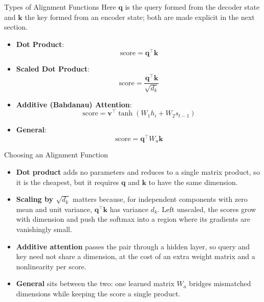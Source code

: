 \begin{frame}{Types of Alignment Functions}
  Here $\mathbf{q}$ is the query formed from the decoder state and $\mathbf{k}$ the key formed from an encoder state; both are made explicit in the next section.
  \begin{itemize}
    \item[\textcolor{red}{$\blacktriangleright$}] \textbf{Dot Product}:
      \begin{equation*}
        \text{score} = \mathbf{q}^\top \mathbf{k}
      \end{equation*}
    \item[\textcolor{red}{$\blacktriangleright$}] \textbf{Scaled Dot Product}:
      \begin{equation*}
        \text{score} = \frac{\mathbf{q}^\top \mathbf{k}}{\sqrt{d_k}}
      \end{equation*}
    \item[\textcolor{red}{$\blacktriangleright$}] \textbf{Additive (Bahdanau) Attention}:
      \begin{equation*}
        \text{score} = \mathbf{v}^\top \tanh(W_1 h_i + W_2 s_{t-1})
      \end{equation*}
    \item[\textcolor{red}{$\blacktriangleright$}] \textbf{General}:
      \begin{equation*}
        \text{score} = \mathbf{q}^\top W_a \mathbf{k}
      \end{equation*}
  \end{itemize}
\end{frame}

\begin{frame}{Choosing an Alignment Function}
  \begin{itemize}
    \item[\textcolor{red}{$\blacktriangleright$}] \textbf{Dot product} adds no parameters and reduces to a single matrix product, so it is the cheapest, but it requires $\mathbf{q}$ and $\mathbf{k}$ to have the same dimension.
    \item[\textcolor{red}{$\blacktriangleright$}] \textbf{Scaling by $\sqrt{d_k}$} matters because, for independent components with zero mean and unit variance, $\mathbf{q}^\top\mathbf{k}$ has variance $d_k$. Left unscaled, the scores grow with dimension and push the softmax into a region where its gradients are vanishingly small.
    \item[\textcolor{red}{$\blacktriangleright$}] \textbf{Additive attention} passes the pair through a hidden layer, so query and key need not share a dimension, at the cost of an extra weight matrix and a nonlinearity per score.
    \item[\textcolor{red}{$\blacktriangleright$}] \textbf{General} sits between the two: one learned matrix $W_a$ bridges mismatched dimensions while keeping the score a single product.
  \end{itemize}
\end{frame}
